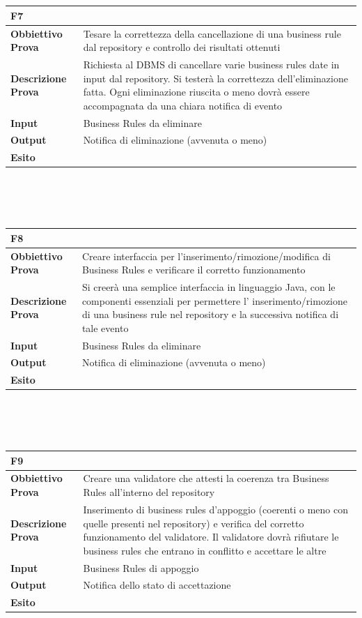 \documentclass[11pt,titlepage,a4paper]{report}
\begin{document}
\\
\\
\begin{tabular}{||p{4.5cm}||p{7.5cm}||}
\hline
\textbf{\textsf{F7}}& \\
\hline
{\textbf {Obbiettivo Prova}}& Tesare la correttezza della cancellazione di una business rule dal repository e controllo dei risultati ottenuti\\ \hline
{\textbf{Descrizione Prova}}&  Richiesta al DBMS di cancellare varie business rules date in input dal repository. Si tester\`a la correttezza dell'eliminazione fatta. Ogni eliminazione riuscita o meno dovr\`a essere accompagnata da una chiara notifica di evento\\ \hline
{\textbf{Input}}& Business Rules da eliminare \\ \hline
{\textbf{Output}}& Notifica di eliminazione (avvenuta o meno) \\ \hline
{\textbf{Esito}}&  \\ \hline
\end{tabular} \\
\\
\\
\begin{tabular}{||p{4.5cm}||p{7.5cm}||}
\hline
\textbf{\textsf{F8}}& \\
\hline
{\textbf {Obbiettivo Prova}}& Creare interfaccia per l'inserimento/rimozione/modifica di Business Rules e verificare il corretto funzionamento\\ \hline
{\textbf{Descrizione Prova}}& Si creer\`a  una semplice interfaccia in linguaggio Java, con le componenti essenziali per permettere l' inserimento/rimozione di una business rule nel repository e la successiva notifica di tale evento \\ \hline
{\textbf{Input}}& Business Rules da eliminare \\ \hline
{\textbf{Output}}& Notifica di eliminazione (avvenuta o meno) \\ \hline
{\textbf{Esito}}&  \\ \hline
\end{tabular} \\
\\
\\
\begin{tabular}{||p{4.5cm}||p{7.5cm}||}
\hline
\textbf{\textsf{F9}}& \\
\hline
{\textbf {Obbiettivo Prova}}& Creare una validatore che attesti la coerenza tra Business Rules all'interno del repository \\ \hline
{\textbf{Descrizione Prova}}& Inserimento di business rules d'appoggio (coerenti o meno con quelle presenti nel repository) e verifica del corretto funzionamento del validatore. Il validatore dovr\`a rifiutare le business rules che entrano in conflitto e accettare le altre \\ \hline
{\textbf{Input}}& Business Rules di appoggio \\ \hline
{\textbf{Output}}& Notifica dello stato di accettazione \\ \hline
{\textbf{Esito}}&  \\ \hline
\end{tabular} \\
\end{document}
